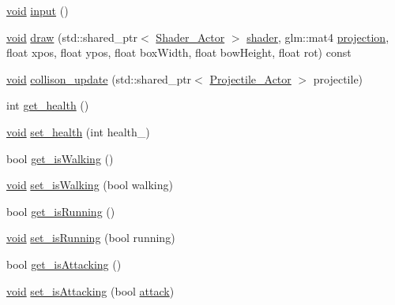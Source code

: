 \begin{DoxyCompactItemize}
\item 
\hyperlink{imgui__impl__opengl3__loader_8h_ac668e7cffd9e2e9cfee428b9b2f34fa7}{void} \hyperlink{classNPC__Actor_a69631753bbb4fc94c3d9e1cd7e550f07}{input} ()
\item 
\hyperlink{imgui__impl__opengl3__loader_8h_ac668e7cffd9e2e9cfee428b9b2f34fa7}{void} \hyperlink{classNPC__Actor_af33500f1aeb5c8e845fdaf386d736050}{draw} (std\+::shared\+\_\+ptr$<$ \hyperlink{classShader__Actor}{Shader\+\_\+\+Actor} $>$ \hyperlink{imgui__impl__opengl3__loader_8h_a57b2a96adb1d51204909a82d861e395e}{shader}, glm\+::mat4 \hyperlink{main__menu__state_8cpp_a565d92bfbcc4a481d2d35f3850a382f7}{projection}, float xpos, float ypos, float box\+Width, float bow\+Height, float rot) const
\item 
\hyperlink{imgui__impl__opengl3__loader_8h_ac668e7cffd9e2e9cfee428b9b2f34fa7}{void} \hyperlink{classNPC__Actor_adce8bd20771bac78d7de190b81da119d}{collison\+\_\+update} (std\+::shared\+\_\+ptr$<$ \hyperlink{classProjectile__Actor}{Projectile\+\_\+\+Actor} $>$ projectile)
\item 
int \hyperlink{classNPC__Actor_aefa30370f75f0af9c12eb3ea67fb3722}{get\+\_\+health} ()
\item 
\hyperlink{imgui__impl__opengl3__loader_8h_ac668e7cffd9e2e9cfee428b9b2f34fa7}{void} \hyperlink{classNPC__Actor_ac60f3b69ca850dbbf77c71275344f8c6}{set\+\_\+health} (int health\+\_\+)
\item 
bool \hyperlink{classNPC__Actor_a3ea00a11b31b55d80f02575ded1a8262}{get\+\_\+is\+Walking} ()
\item 
\hyperlink{imgui__impl__opengl3__loader_8h_ac668e7cffd9e2e9cfee428b9b2f34fa7}{void} \hyperlink{classNPC__Actor_a5df8dbfeafc9e69da41dbbeac85d92b2}{set\+\_\+is\+Walking} (bool walking)
\item 
bool \hyperlink{classNPC__Actor_a1eeb245ce58c7a7dd49562eff05a6f95}{get\+\_\+is\+Running} ()
\item 
\hyperlink{imgui__impl__opengl3__loader_8h_ac668e7cffd9e2e9cfee428b9b2f34fa7}{void} \hyperlink{classNPC__Actor_a78bf8b2ada74d5e95fc780feb2c1b30d}{set\+\_\+is\+Running} (bool running)
\item 
bool \hyperlink{classNPC__Actor_a7111e6b53b445ce038079e25ea080882}{get\+\_\+is\+Attacking} ()
\item 
\hyperlink{imgui__impl__opengl3__loader_8h_ac668e7cffd9e2e9cfee428b9b2f34fa7}{void} \hyperlink{classNPC__Actor_ab31d259c92592433e390e68915a22f69}{set\+\_\+is\+Attacking} (bool \hyperlink{classNPC__Actor_a9af988fb1e657f9d8aed581cb6ad4b92}{attack})
\item 

\end{DoxyCompactItemize}
